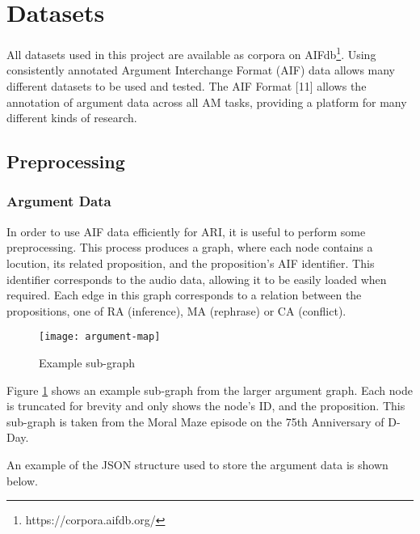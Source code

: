 \hypertarget{datasets}{%
\section{Datasets}\label{datasets}}

All datasets used in this project are available as corpora on
AIFdb\footnote{https://corpora.aifdb.org/}. Using consistently annotated
Argument Interchange Format (AIF) data allows many different datasets to
be used and tested. The AIF Format {[}11{]} allows the annotation of
argument data across all AM tasks, providing a platform for many
different kinds of research.

\hypertarget{preprocessing}{%
\subsection{Preprocessing}\label{preprocessing}}

\hypertarget{argument-data}{%
\subsubsection{Argument Data}\label{argument-data}}

In order to use AIF data efficiently for ARI, it is useful to perform
some preprocessing. This process produces a graph, where each node
contains a locution, its related proposition, and the proposition's AIF
identifier. This identifier corresponds to the audio data, allowing it
to be easily loaded when required. Each edge in this graph corresponds
to a relation between the propositions, one of RA (inference), MA
(rephrase) or CA (conflict).

\begin{figure}[h!]
\begin{center}
\texttt{[image: argument-map]}
\caption{Example sub-graph \label{fig:arg-map}}
\end{center}
\end{figure}

Figure \ref{fig:arg-map} shows an example sub-graph from the larger
argument graph. Each node is truncated for brevity and only shows the
node's ID, and the proposition. This sub-graph is taken from the Moral
Maze episode on the 75th Anniversary of D-Day.

An example of the JSON structure used to store the argument data is
shown below.

